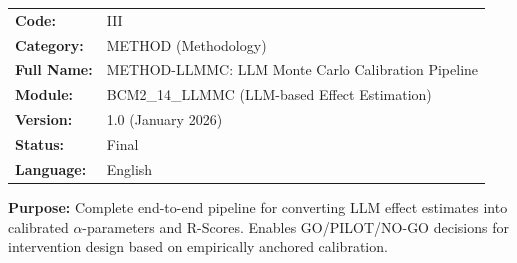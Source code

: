 %
%


\begin{tcolorbox}[colback=gray!5!white, colframe=gray!75!black,
    title=Appendix Header: III METHOD-LLMMC]

\begin{tabular}{@{}ll@{}}
\textbf{Code:} & III \\
\textbf{Category:} & METHOD (Methodology) \\
\textbf{Full Name:} & METHOD-LLMMC: LLM Monte Carlo Calibration Pipeline \\
\textbf{Module:} & BCM2\_14\_LLMMC (LLM-based Effect Estimation) \\
\textbf{Version:} & 1.0 (January 2026) \\
\textbf{Status:} & Final \\
\textbf{Language:} & English \\
\end{tabular}

\vspace{0.5em}
\textbf{Purpose:} Complete end-to-end pipeline for converting LLM effect estimates
into calibrated $\alpha$-parameters and R-Scores. Enables GO/PILOT/NO-GO decisions
for intervention design based on empirically anchored calibration.

\end{tcolorbox}

